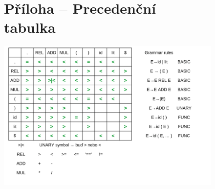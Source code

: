\documentclass[12pt]{article}
\begin{document}
    \newpage
    \begin{figure}
    \section{Příloha -- Precedenční tabulka}
        \begin{center}
            \includegraphics[scale=0.34]{precedence-table-1.png}
            \label{Prec}
        \end{center}
    \end{figure}
\end{document}
